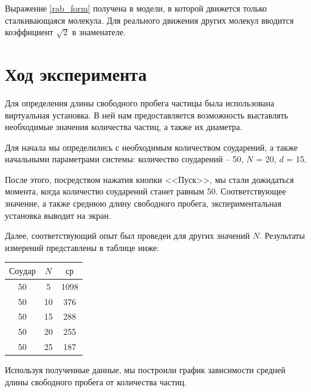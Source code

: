 \documentclass[a4paper,12pt]{article}
\begin{document}
Выражение \eqref{rab_form} получена в модели, в которой движется только сталкивающаяся молекула. Для реального движения других молекул вводится коэффициент $\sqrt2$ в знаменателе.

\newpage

\section{Ход эксперимента}
\hspace{\parindent}Для определения длины свободного пробега частицы была использована виртуальная установка. В ней нам предоставляется возможность выставлять необходимые значения количества частиц, а также их диаметра. 

Для начала мы определились с необходимым количеством соударений, а также начальными параметрами системы: количество соударений -- 50, $N$ = 20, $d$ = 15. 

После этого, посредством нажатия кнопки <<Пуск>>, мы стали дожидаться момента, когда количество соударений станет равным 50. Соответствующее значение, а также среднюю длину свободного пробега, экспериментальная установка выводит на экран. 

Далее, соответствующий опыт был проведен для других значений $N$. Результаты измерений представлены в таблице ниже:
\begin{center}
	\begin{tabular}{|c|c|c|}
		\hline
		$Соудар$&		$N$&		$ср$\\
		\hline
		50&		5&		1098\\
		\hline
		50&		10&		376\\
		\hline
		50&		15&		288\\
		\hline
		50&		20&		255\\
		\hline
		50&		25&		187\\
		\hline
		
	\end{tabular}
\end{center}

Используя полученные данные, мы построили график зависимости средней длины свободного пробега от количества частиц.
\end{document}
